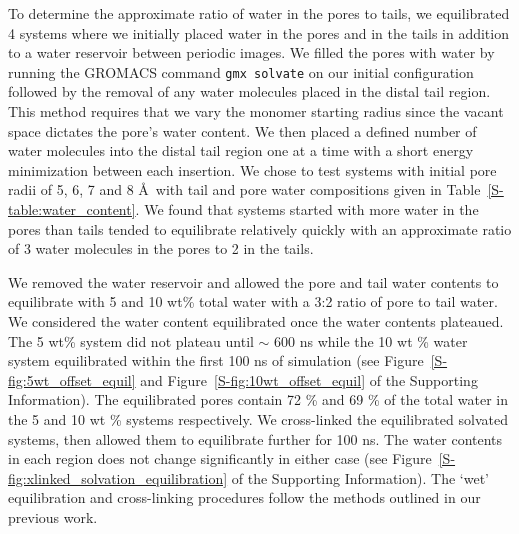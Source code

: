 \documentclass[journal=jpcbfk,manuscript=article]{achemso}
\begin{document}
  To determine the approximate ratio of water in the pores to tails, we equilibrated 4 systems
  where we initially placed water in the pores and in the tails in addition to a water
  reservoir between periodic images. We filled the pores with water by running the 
  GROMACS command \texttt{gmx solvate} on our initial configuration followed by the 
  removal of any water molecules placed in the distal tail region. This method requires
  that we vary the monomer starting radius since the vacant space dictates the pore's 
  water content. We then placed a defined number of water molecules into the distal tail
  region one at a time with a short energy minimization between each insertion.
  We chose to test systems with initial pore radii of 5, 6, 7 and 8 \AA~with tail and 
  pore water compositions given in Table~\ref{S-table:water_content}. We found that 
  systems started with more water in the pores than tails tended to equilibrate relatively
  quickly with an approximate ratio of 3 water molecules in the pores to 2 in the tails.
  
  We removed the water reservoir and allowed the pore and tail water
  contents to equilibrate with 5 and 10 wt\% total water with a 3:2 ratio
  of pore to tail water. We considered the water content
  equilibrated once the water contents plateaued. The 5 wt\% system did
  not plateau until $\sim$ 600 ns 
  while the 10 wt \% water system equilibrated within the first 100 ns of 
  simulation (see Figure~\ref{S-fig:5wt_offset_equil} and Figure~\ref{S-fig:10wt_offset_equil} of
  the Supporting Information). The equilibrated pores contain 72 \% and 69 \% of the total water in the
  5 and 10 wt \% systems respectively. We cross-linked the equilibrated 
  solvated systems, then allowed them to equilibrate further for 100 ns. 
  The water contents in each region does not change significantly in either case 
  (see Figure~\ref{S-fig:xlinked_solvation_equilibration} of the Supporting Information).
  The `wet' equilibration and cross-linking procedures follow
  the methods outlined in our previous work.
\end{document}
